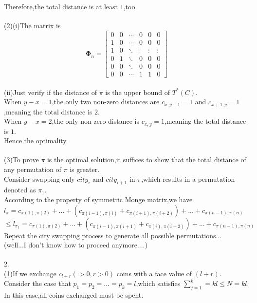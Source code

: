 \documentclass{article}
\begin{document}
Therefore,the total distance is at least $1$,too.\\
\\
(2)(i)The matrix  is
\[
\mathbf{\Phi}_n = \begin{bmatrix}
0      & 0      & \cdots & 0      & 0      & 0 \\
1      & 0      & \cdots & 0      & 0      & 0 \\
1     & 0      & \ddots & \vdots & \vdots & \vdots \\
0      & 1      & \ddots & 0      & 0      & 0 \\
0      & 0      & \ddots & 0      & 0      & 0 \\
0      & 0      & \cdots & 1      & 1      & 0
\end{bmatrix}
\]\\
(ii)Just verify if the distance of $\pi$ is the upper bound of $T^*(C)$.\\
When $y-x=1$,the only two non-zero distances are $c_{x,y-1}=1$ and $c_{x+1,y}=1$,meaning the total distance is $2$.\\
When $y-x=2$,the only non-zero distance is $c_{x,y}=1$,meaning the total distance is $1$.\\
Hence the optimality.\\
\\
(3)To prove $\pi$ is the optimal solution,it suffices to show that the total distance of any permutation of  $\pi$ is greater.\\
Consider swapping only $city_i$ and $city_{i+1}$ in $\pi$,which results in a permutation denoted as $\pi_1$.\\
According to the property of symmetric Monge matrix,we have\\
$l_\pi=c_{\pi(1),\pi(2)}+...+(c_{\pi(i-1),\pi(i)}+c_{\pi(i+1),\pi(i+2)})+...+c_{\pi(n-1),\pi(n)}
$\\
$\leq
l_{\pi_1}=c_{\pi(1),\pi(2)}+...+(c_{\pi(i-1),\pi(i+1)}+c_{\pi(i),\pi(i+2)})+...+c_{\pi(n-1),\pi(n)}$\\
Repeat the city swapping process to generate all possible permutations...\\(well...I don't know how to proceed anymore....)\\
\\
2.\\
(1)If we exchange $c_{l+r}(>0,r>0)$ coins with a face value of  $(l+r)$.\\Consider the case that $p_1=p_2=...=p_k=l$,which satisfies $\sum_{j=1}^k=kl\leq N=kl$.\\
In this case,all coins exchanged must be spent.\\
\end{document}
